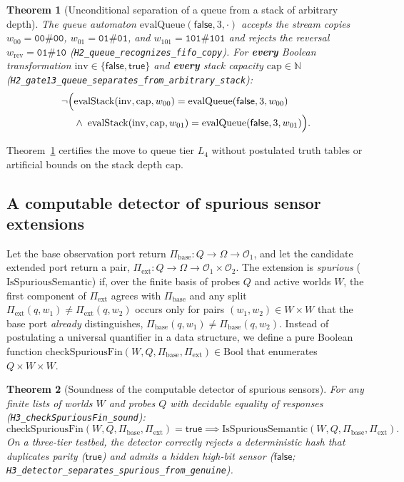 \documentclass[11pt,a4paper]{article}
\theoremstyle{cleanthm}
\newtheorem{theorem}{Theorem}[section]
\DeclareRobustCommand{\id}[1]{\allowbreak\nolinkurl{#1}\allowbreak}
\begin{document}
\begin{theorem}[Unconditional separation of a queue from a stack of arbitrary depth]
\label{thm:h2_queue_vs_stack}
The queue automaton $\mathrm{evalQueue}(\mathsf{false},3,\cdot)$ accepts the stream copies $w_{00}=\mathtt{00\#00}$, $w_{01}=\mathtt{01\#01}$, and $w_{101}=\mathtt{101\#101}$ and rejects the reversal $w_{\mathrm{rev}}=\mathtt{01\#10}$ (\id{H2_queue_recognizes_fifo_copy}). For \textbf{every} Boolean transformation $\mathrm{inv}\in\{\mathsf{false},\mathsf{true}\}$ and \textbf{every} stack capacity $\mathrm{cap}\in\mathbb N$ (\id{H2_gate13_queue_separates_from_arbitrary_stack}):
\begin{equation}
  \neg\begin{aligned}[t]
    \Bigl(&\mathrm{evalStack}(\mathrm{inv},\mathrm{cap},w_{00}) = \mathrm{evalQueue}(\mathsf{false},3,w_{00}) \\
          &\land\; \mathrm{evalStack}(\mathrm{inv},\mathrm{cap},w_{01}) = \mathrm{evalQueue}(\mathsf{false},3,w_{01})\Bigr).
  \end{aligned}
\end{equation}
\end{theorem}
Theorem~\ref{thm:h2_queue_vs_stack} certifies the move to queue tier $L_4$ without postulated truth tables or artificial bounds on the stack depth $\mathrm{cap}$.

\subsection{A computable detector of spurious sensor extensions}
Let the base observation port return $\Pi_{\mathrm{base}}:Q\to\Omega\to\mathcal O_1$, and let the candidate extended port return a pair, $\Pi_{\mathrm{ext}}:Q\to\Omega\to\mathcal O_1\times\mathcal O_2$. The extension is \emph{spurious} ($\mathrm{IsSpuriousSemantic}$) if, over the finite basis of probes $Q$ and active worlds $W$, the first component of $\Pi_{\mathrm{ext}}$ agrees with $\Pi_{\mathrm{base}}$ and any split $\Pi_{\mathrm{ext}}(q,w_1)\ne\Pi_{\mathrm{ext}}(q,w_2)$ occurs only for pairs $(w_1,w_2)\in W\times W$ that the base port \emph{already} distinguishes, $\Pi_{\mathrm{base}}(q,w_1)\ne\Pi_{\mathrm{base}}(q,w_2)$.
Instead of postulating a universal quantifier in a data structure, we define a pure Boolean function $\mathrm{checkSpuriousFin}(W,Q,\Pi_{\mathrm{base}},\Pi_{\mathrm{ext}})\in\mathrm{Bool}$ that enumerates $Q\times W\times W$.

\begin{theorem}[Soundness of the computable detector of spurious sensors]
\label{thm:h3_spurious}
For any finite lists of worlds $W$ and probes $Q$ with decidable equality of responses (\id{H3_checkSpuriousFin_sound}):
\begin{equation}
  \mathrm{checkSpuriousFin}(W,Q,\Pi_{\mathrm{base}},\Pi_{\mathrm{ext}}) = \mathsf{true} \implies \mathrm{IsSpuriousSemantic}(W,Q,\Pi_{\mathrm{base}},\Pi_{\mathrm{ext}}).
\end{equation}
On a three-tier testbed, the detector correctly rejects a deterministic hash that duplicates parity ($\mathsf{true}$) and admits a hidden high-bit sensor ($\mathsf{false}$; \id{H3_detector_separates_spurious_from_genuine}).
\end{theorem}
\end{document}
